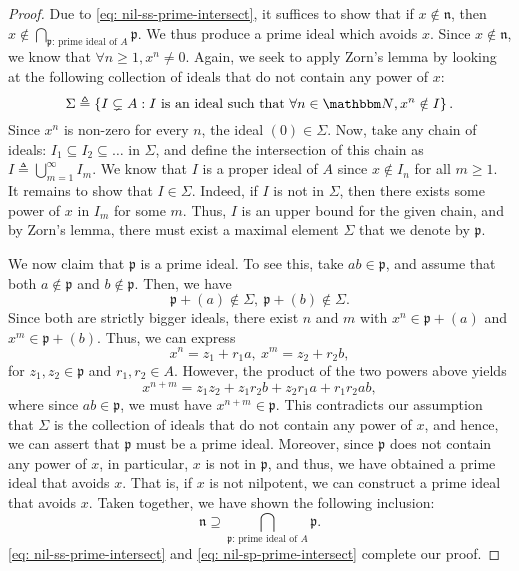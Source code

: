 \begin{proof}
Due to \eqref{eq: nil-ss-prime-intersect}, it suffices to show that if $x \notin \mathfrak{n}$, then $x \notin \bigcap_{\mathfrak{p} \text{: prime ideal of } A} \mathfrak{p}$. We thus produce a prime ideal which avoids $x$. Since $x \notin \mathfrak{n}$, we know that $\forall n \geq 1, x^{n} \neq 0 $. Again, we seek to apply Zorn's lemma by looking at the following collection of ideals that do not contain any power of $x$:
\[\Sigma \triangleq\left\{I \subsetneq A: I\text{ is an ideal such that }\forall n \in {\N}, x^{n} \notin I\right\}.\]
Since $x^{n}$ is non-zero for every $n$, the ideal $(0) \in \Sigma$. Now, take any chain of ideals: $I_{1} \subseteq I_{2} \subseteq \ldots$ in $\Sigma$, and define the intersection of this chain as $I \triangleq \bigcup_{m=1}^{\infty} I_{m}$. We know that $I$ is a proper ideal of $A$ since $x \notin I_n$ for all $m \ge 1$. It remains to show that $I \in \Sigma$. Indeed, if $I$ is not in $\Sigma$, then there exists some power of $x$ in $I_{m}$ for some $m$. Thus, $I$ is an upper bound for the given chain, and by Zorn's lemma, there must exist a maximal element $\Sigma$ that we denote by $\mathfrak{p}$. 

We now claim that $\mathfrak{p}$ is a prime ideal. To see this, take $a b \in \mathfrak{p}$, and assume that both  $a \notin \mathfrak{p}$ and $b \notin \mathfrak{p}$. Then, we have
\[\mathfrak{p}+(a) \notin \Sigma,\ \mathfrak{p}+(b) \notin \Sigma.\]
Since both are strictly bigger ideals, there exist $n$ and $m$ with $x^{n} \in \mathfrak{p}+(a)$ and $x^{m} \in \mathfrak{p}+(b)$. Thus, we can express
\[x^{n}=z_{1}+r_{1} a,\ x^{m}=z_{2}+r_{2} b,\]
for $z_1, z_2 \in \mathfrak{p}$ and $r_1, r_2 \in A$.
However, the product of the two powers above yields
\[x^{n+m}=z_{1} z_{2}+z_{1} r_{2} b+z_{2} r_{1} a+r_{1} r_{2} a b,\]
where since $ab \in \mathfrak{p}$, we must have $x^{n+m} \in \mathfrak{p}$.
This contradicts our assumption that $\Sigma$ is the collection of ideals that do not contain any power of $x$, and hence, we can assert that $\mathfrak{p}$ must be a prime ideal. Moreover, since $\mathfrak{p}$ does not contain any power of $x$, in particular, $x$ is not in $\mathfrak{p}$, and thus, we have obtained a prime ideal that avoids $x$. That is, if $x$ is not nilpotent, we can construct a prime ideal that avoids $x$. Taken together, we have shown the following inclusion:
\begin{equation}\label{eq: nil-sp-prime-intersect}
    \mathfrak{n} \supseteq \bigcap_{\mathfrak{p} \text{: prime ideal of } A} \mathfrak{p}.
\end{equation}
\cref{eq: nil-ss-prime-intersect} and \eqref{eq: nil-sp-prime-intersect} complete our proof.
\end{proof}

